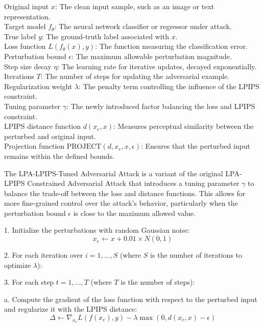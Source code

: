 Original input $x$: The clean input sample, such as an image or text representation. \\
Target model $f_{\theta}$: The neural network classifier or regressor under attack. \\
True label $y$: The ground-truth label associated with $x$. \\
Loss function $L(f_{\theta}(x), y)$: The function measuring the classification error. \\
Perturbation bound $\epsilon$: The maximum allowable perturbation magnitude. \\
Step size decay $\eta$: The learning rate for iterative updates, decayed exponentially. \\
Iterations $T$: The number of steps for updating the adversarial example. \\
Regularization weight $\lambda$: The penalty term controlling the influence of the LPIPS constraint. \\
Tuning parameter $\gamma$: The newly introduced factor balancing the loss and LPIPS constraint. \\
LPIPS distance function $d(x_e, x)$: Measures perceptual similarity between the perturbed and original input. \\
Projection function $\text{PROJECT}(d, x_e, x, \epsilon)$: Ensures that the perturbed input remains within the defined bounds.



The LPA-LPIPS-Tuned Adversarial Attack is a variant of the original LPA-LPIPS Constrained Adversarial Attack that introduces a tuning parameter $\gamma$ to balance the trade-off between the loss and distance functions. This allows for more fine-grained control over the attack's behavior, particularly when the perturbation bound $\epsilon$ is close to the maximum allowed value.


1. Initialize the perturbations with random Gaussian noise:
   \[
   x_e \leftarrow x + 0.01 \times N(0, 1)
   \]
   
2. For each iteration over $i = 1, \ldots, S$ (where $S$ is the number of iterations to optimize $\lambda$):

    3. For each step $t = 1, \ldots, T$ (where $T$ is the number of steps):

        a. Compute the gradient of the loss function with respect to the perturbed input and regularize it with the LPIPS distance:
           \[
           \Delta \leftarrow \nabla_{x_e} L(f(x_e), y) - \lambda \max \left(0, d(x_e, x) - \epsilon \right)
           \]
           
